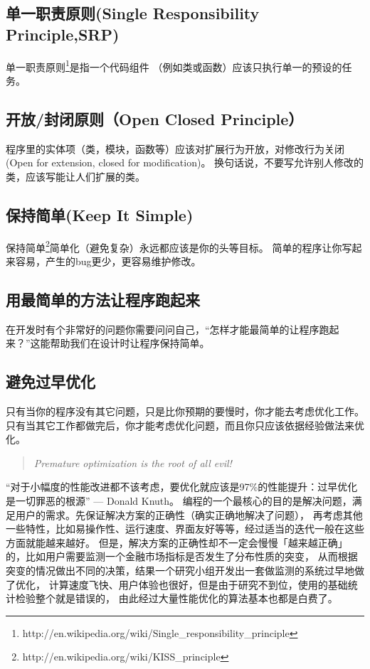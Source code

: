 \documentclass{book}
\begin{document}
\subsection{单一职责原则(Single Responsibility Principle,SRP)}

单一职责原则\footnote{http://en.wikipedia.org/wiki/Single\_responsibility\_principle}是指一个代码组件
（例如类或函数）应该只执行单一的预设的任务。

\subsection{开放/封闭原则（Open Closed Principle）}

程序里的实体项（类，模块，函数等）应该对扩展行为开放，对修改行为关闭(Open for extension, closed for modification)。
换句话说，不要写允许别人修改的类，应该写能让人们扩展的类。

\subsection{保持简单(Keep It Simple)}

保持简单\footnote{http://en.wikipedia.org/wiki/KISS\_principle}简单化（避免复杂）永远都应该是你的头等目标。
简单的程序让你写起来容易，产生的bug更少，更容易维护修改。

\subsection{用最简单的方法让程序跑起来}

在开发时有个非常好的问题你需要问问自己，“怎样才能最简单的让程序跑起来？”这能帮助我们在设计时让程序保持简单。

\subsection{避免过早优化}

只有当你的程序没有其它问题，只是比你预期的要慢时，你才能去考虑优化工作。
只有当其它工作都做完后，你才能考虑优化问题，而且你只应该依据经验做法来优化。
\begin{quote}
 \emph{Premature optimization is the root of all evil!}
\end{quote}
“对于小幅度的性能改进都不该考虑，要优化就应该是97\%的性能提升：过早优化是一切罪恶的根源” — Donald Knuth。
编程的一个最核心的目的是解决问题，满足用户的需求。先保证解决方案的正确性（确实正确地解决了问题），
再考虑其他一些特性，比如易操作性、运行速度、界面友好等等，经过适当的迭代一般在这些方面就能越来越好。
但是，解决方案的正确性却不一定会慢慢「越来越正确」的，比如用户需要监测一个金融市场指标是否发生了分布性质的突变，
从而根据突变的情况做出不同的决策，结果一个研究小组开发出一套做监测的系统过早地做了优化，
计算速度飞快、用户体验也很好，但是由于研究不到位，使用的基础统计检验整个就是错误的，
由此经过大量性能优化的算法基本也都是白费了。
\end{document}
